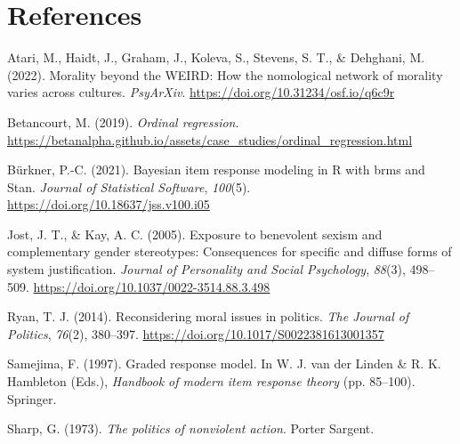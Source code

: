 \documentclass[12pt, letterpaper]{article}
\newenvironment{CSLReferences}[2]{}{}
\begin{document}
\newpage

\hypertarget{references}{%
\section{References}\label{references}}

\begingroup

\noindent \setlength{\parindent}{-0.5in} \setlength{\leftskip}{0.5in}

\hypertarget{refs}{}
\begin{CSLReferences}{1}{0}
\leavevmode{}%
Atari, M., Haidt, J., Graham, J., Koleva, S., Stevens, S. T., \&
Dehghani, M. (2022). Morality beyond the {WEIRD}: How the nomological
network of morality varies across cultures. \emph{PsyArXiv}.
\url{https://doi.org/10.31234/osf.io/q6c9r}

\leavevmode{}%
Betancourt, M. (2019). \emph{Ordinal regression}.
\url{https://betanalpha.github.io/assets/case_studies/ordinal_regression.html}

\leavevmode{}%
Bürkner, P.-C. (2021). Bayesian item response modeling in {R} with brms
and {Stan}. \emph{Journal of Statistical Software}, \emph{100}(5).
\url{https://doi.org/10.18637/jss.v100.i05}

\leavevmode{}%
Jost, J. T., \& Kay, A. C. (2005). Exposure to benevolent sexism and
complementary gender stereotypes: Consequences for specific and diffuse
forms of system justification. \emph{Journal of Personality and Social
Psychology}, \emph{88}(3), 498--509.
\url{https://doi.org/10.1037/0022-3514.88.3.498}

\leavevmode{}%
Ryan, T. J. (2014). Reconsidering moral issues in politics. \emph{The
Journal of Politics}, \emph{76}(2), 380--397.
\url{https://doi.org/10.1017/S0022381613001357}

\leavevmode{}%
Samejima, F. (1997). Graded response model. In W. J. van der Linden \&
R. K. Hambleton (Eds.), \emph{Handbook of modern item response theory}
(pp. 85--100). Springer.

\leavevmode{}%
Sharp, G. (1973). \emph{The politics of nonviolent action}. Porter
Sargent.

\end{CSLReferences}
\end{document}
